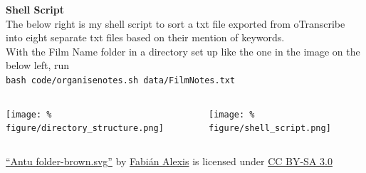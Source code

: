 \documentclass[unknownkeysallowed,usepdftitle=false, parskip=full]{beamer}
\newcommand{\secvariable}{nothing}
\newcommand{\mysection}[1]{\renewcommand{\secvariable}{#1}
}
\begin{document}
\mysection{line}
\begin{frame}\label{\secvariable}
\begin{center}
  \vspace{-0.5cm}
\textbf{Shell Script}\\
\vspace{2pt}
\footnotesize{The below right is my shell script to sort a txt file exported from oTranscribe into eight separate txt files based on their mention of keywords.\\
With the Film Name folder in a directory set up like the one in the image on the below left, run} \\
\texttt{bash code/organise\textunderscore notes.sh data/Film\textunderscore Notes.txt}

\end{center}

 \begin{columns}[t]
  
      \begin{column}[c]{0.45\textwidth}

\texttt{[image: \%
figure/directory\_structure.png]}

    \end{column}
  
  \begin{column}[c]{0.45\textwidth}

\texttt{[image: \%
figure/shell\_script.png]}



    \end{column}
    
    
  \end{columns}

\begin{center}
\tiny{\href{https://commons.wikimedia.org/wiki/File:Antu_folder-brown.svg}{“Antu folder-brown.svg”} by \href{https://github.com/fabianalexisinostroza/}{Fabián Alexis} is licensed under \href{https://creativecommons.org/licenses/by-sa/3.0/deed.en}{CC BY-SA 3.0}} 
\end{center}

  
\end{frame}
\end{document}
